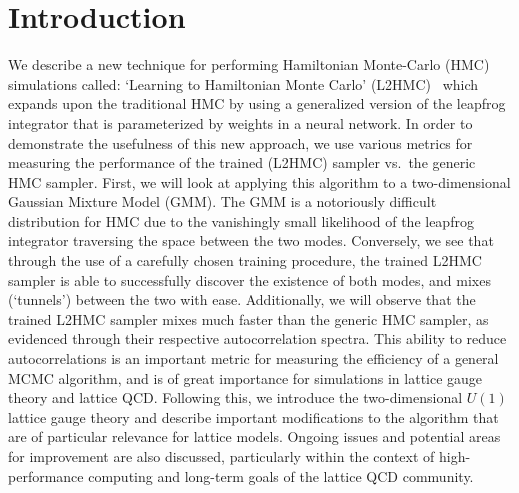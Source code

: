 \documentclass[../main.tex]{subfiles}
\begin{document}
\section{Introduction}%
\label{sec:l2hmc_intro}
%
We describe a new technique for performing Hamiltonian Monte-Carlo (HMC)
simulations called: `Learning to Hamiltonian Monte Carlo'
(L2HMC)~\cite{2017arXiv171109268L} which expands upon the traditional HMC by
using a generalized version of the leapfrog integrator that is parameterized by
weights in a neural network.
%
In order to demonstrate the usefulness of this new approach, we use various
metrics for measuring the performance of the trained (L2HMC) sampler vs.\ the
generic HMC sampler.
%
First, we will look at applying this algorithm to a two-dimensional Gaussian
Mixture Model (GMM).
%
The GMM is a notoriously difficult distribution for HMC due to the vanishingly
small likelihood of the leapfrog integrator traversing the space between the
two modes.
%
Conversely, we see that through the use of a carefully chosen training
procedure, the trained L2HMC sampler is able to successfully discover the
existence of both modes, and mixes (`tunnels') between the two with ease. 
%
Additionally, we will observe that the trained L2HMC sampler mixes much faster
than the generic HMC sampler, as evidenced through their respective
autocorrelation spectra.
%
This ability to reduce autocorrelations is an important metric for measuring
the efficiency of a general MCMC algorithm, and is of great importance for
simulations in lattice gauge theory and lattice QCD.
%
Following this, we introduce the two-dimensional $U(1)$ lattice gauge theory
and describe important modifications to the algorithm that are of particular
relevance for lattice models.
%
Ongoing issues and potential areas for improvement are also discussed,
particularly within the context of high-performance computing and long-term
goals of the lattice QCD community.
%
\end{document}

